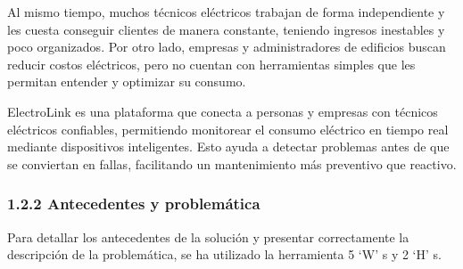 Al mismo tiempo, muchos técnicos eléctricos trabajan de forma
independiente y les cuesta conseguir clientes de manera constante,
teniendo ingresos inestables y poco organizados. Por otro lado, empresas
y administradores de edificios buscan reducir costos eléctricos, pero no
cuentan con herramientas simples que les permitan entender y optimizar
su consumo.

ElectroLink es una plataforma que conecta a personas y empresas con
técnicos eléctricos confiables, permitiendo monitorear el consumo
eléctrico en tiempo real mediante dispositivos inteligentes. Esto ayuda
a detectar problemas antes de que se conviertan en fallas, facilitando
un mantenimiento más preventivo que reactivo.

\subsubsection{1.2.2 Antecedentes y
problemática}\label{report__10-cap1-introduccion.md__antecedentes-y-problemuxe1tica}

Para detallar los antecedentes de la solución y presentar correctamente
la descripción de la problemática, se ha utilizado la herramienta 5 `W'
s y 2 `H' s.

